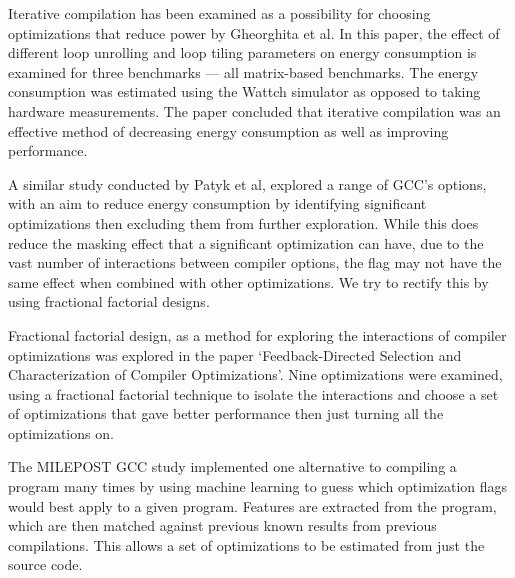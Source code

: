 \documentclass[twocolumn]{article}
\begin{document}
Iterative compilation has been examined as a possibility for choosing optimizations that reduce power by Gheorghita et al\cite{IterativeCompilationForEnergy}. In this paper, the effect of different loop unrolling and loop tiling parameters on energy consumption is examined for three benchmarks --- all matrix-based benchmarks. The energy consumption was estimated using the Wattch simulator as opposed to taking hardware measurements. The paper concluded that iterative compilation was an effective method of decreasing energy consumption as well as improving performance.


A similar study conducted by Patyk et al\cite{EnergyReductionCompilerOptions}, explored a range of GCC's options, with an aim to reduce energy consumption by identifying significant optimizations then excluding them from further exploration. While this does reduce the masking effect that a significant optimization can have, due to the vast number of interactions between compiler options, the flag may not have the same effect when combined with other optimizations. We try to rectify this by using fractional factorial designs.

Fractional factorial design, as a method for exploring the interactions of compiler optimizations was explored in the paper `Feedback-Directed Selection and Characterization of Compiler Optimizations'\cite{IntelPaper}. Nine optimizations were examined, using a fractional factorial technique to isolate the interactions and choose a set of optimizations that gave better performance then just turning all the optimizations on.

The MILEPOST GCC\cite{Fursin2011} study implemented one alternative to compiling a program many times by using machine learning to guess which optimization flags would best apply to a given program. Features are extracted from the program, which are then matched against previous known results from previous compilations. This allows a set of optimizations to be estimated from just the source code.
\end{document}
